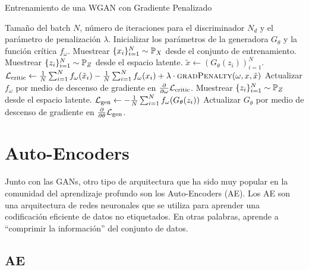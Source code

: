 \begin{algorithm}[H]
    \caption{Entrenamiento de una WGAN con Gradiente Penalizado \cite{gulrajani2017improved}}\label{alg:WGAN-GP}
    \begin{algorithmic}[1]
        \Require Tamaño del batch $N$, número de iteraciones para el discriminador $N_d$ y el parámetro de penalización $\lambda$.
        \State Inicializar los parámetros de la generadora $G_\theta$ y la función crítica $f_\omega$.
        \State Muestrear $\{x_i\}_{i=1}^{N} \sim \Prob_X$ desde el conjunto de entrenamiento.
        \State Muestrear $\{z_i\}_{i=1}^{N} \sim \Prob_Z$ desde el espacio latente.
        \State $\tilde x \gets (G_\theta(z_i))_{i=1}^{N}$.
        \State $\cL_{\mathrm{critic}} \gets
            \frac{1}{N} \sum_{i=1}^{N} f_{\omega}(\tilde x_i) - \frac{1}{N} \sum_{i=1}^{N} f_{\omega}(x_i) + \lambda \cdot \Call{gradPenalty}{\omega, x, \tilde x}$
        \State Actualizar $f_{\omega}$ por medio de descenso de gradiente en $\pdv{\omega} \mathcal{L}_{\mathrm{critic}}$.
        \EndFor
        \State Muestrear $\{z_i\}_{i=1}^{N} \sim \Prob_Z$ desde el espacio latente.
        \State $\mathcal{L}_{\mathrm{gen}} \gets - \frac{1}{N}\sum_{i=1}^{N} f_\omega(G_\theta(z_i))$
        \State Actualizar $G_\theta$ por medio de descenso de gradiente en $\pdv{\theta} \mathcal{L}_{\mathrm{gen}}$.
        \EndWhile
    \end{algorithmic}
\end{algorithm}



\section{Auto-Encoders}\label{sec:auto-Encoders}  %

Junto con las GANs, otro tipo de arquitectura que ha sido muy popular en la comunidad del aprendizaje profundo son los Auto-Encoders (AE). Los AE son una arquitectura de redes neuronales que se utiliza para aprender una codificación eficiente de datos no etiquetados. En otras palabras, aprende a ``comprimir la información'' del conjunto de datos.

\subsection{AE}\label{ssec:AE}  %

